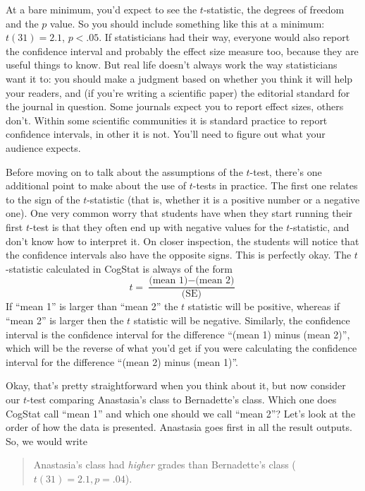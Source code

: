 \documentclass[
  11pt,
  a4paper,
  twoside,symmetric,openright]{book}
\theoremstyle{break}
\theoremstyle{break}
\begin{document}
At a bare minimum, you'd expect to see the \(t\)-statistic, the degrees of freedom and the \(p\) value. So you should include something like this at a minimum: \(t(31) = 2.1\), \(p<.05\). If statisticians had their way, everyone would also report the confidence interval and probably the effect size measure too, because they are useful things to know. But real life doesn't always work the way statisticians want it to: you should make a judgment based on whether you think it will help your readers, and (if you're writing a scientific paper) the editorial standard for the journal in question. Some journals expect you to report effect sizes, others don't. Within some scientific communities it is standard practice to report confidence intervals, in other it is not. You'll need to figure out what your audience expects.

Before moving on to talk about the assumptions of the \(t\)-test, there's one additional point to make about the use of \(t\)-tests in practice. The first one relates to the sign of the \(t\)-statistic (that is, whether it is a positive number or a negative one). One very common worry that students have when they start running their first \(t\)-test is that they often end up with negative values for the \(t\)-statistic, and don't know how to interpret it. On closer inspection, the students will notice that the confidence intervals also have the opposite signs. This is perfectly okay. The \(t\)-statistic calculated in CogStat is always of the form
\[
t = \frac{\mbox{(mean 1)} -\mbox{(mean 2)}}{ \mbox{(SE)}}
\]
If ``mean 1'' is larger than ``mean 2'' the \(t\) statistic will be positive, whereas if ``mean 2'' is larger then the \(t\) statistic will be negative. Similarly, the confidence interval is the confidence interval for the difference ``(mean 1) minus (mean 2)'', which will be the reverse of what you'd get if you were calculating the confidence interval for the difference ``(mean 2) minus (mean 1)''.

Okay, that's pretty straightforward when you think about it, but now consider our \(t\)-test comparing Anastasia's class to Bernadette's class. Which one does CogStat call ``mean 1'' and which one should we call ``mean 2''? Let's look at the order of how the data is presented. Anastasia goes first in all the result outputs. So, we would write

\begin{quote}
Anastasia's class had \emph{higher} grades than Bernadette's class (\(t(31)= 2.1, p=.04\)).
\end{quote}
\end{document}
